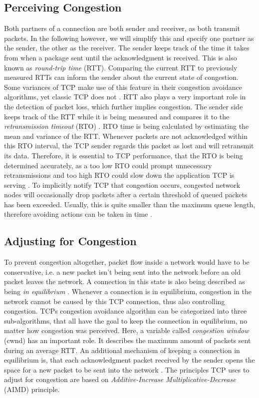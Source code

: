 \documentclass[a4paper,conference]{IEEEtran}
\begin{document}
\subsection{Perceiving Congestion}
\label{P_C_marker}
Both partners of a connection are both sender and receiver, as both transmit packets. In the following however, we will simplify this and specify one partner as the sender, the other as the receiver. The sender keeps track of the time it takes from when a package sent until the acknowledgment is received. This is also known as \textit{round-trip time} (RTT). Comparing the current RTT to previously measured RTTs can inform the sender about the current state of congestion. Some variances of TCP make use of this feature in their congestion avoidance algorithms, yet classic TCP does not \cite{huston2000tcp,jacobson1995congestion}. RTT also plays a very important role in the detection of packet loss, which further implies congestion. The sender side keeps track of the RTT while it is being measured and compares it to the \textit{retransmission timeout} (RTO) \cite{jacobson1992tcp}. RTO time is being calculated by estimating the mean and variance of the RTT. Whenever packets are not acknowledged within this RTO interval, the TCP sender regards this packet as lost and will retransmit its data. Therefore, it is essential to TCP performance, that the RTO is being determined accurately, as a too low RTO could prompt unnecessary retransmissions and too high RTO could slow down the application TCP is serving \cite{huston2000tcp,jacobson1995congestion}. To implicitly notify TCP that congestion occurs, congested network nodes will occasionally drop packets after a certain threshold of queued packets has been exceeded. Usually, this is quite smaller than the maximum queue length, therefore avoiding actions can be taken in time \cite{ramakrishnan1999proposal}.

\subsection{Adjusting for Congestion}
\label{AfC}
To prevent congestion altogether, packet flow inside a network would have to be conservative, i.e. a new packet isn't being sent into the network before an old packet leaves the network. A connection in this state is also being described as being \textit{in equilibrium} \cite{jacobson1992tcp}. Whenever a connection is in equilibrium, congestion in the network cannot be caused by this TCP connection, thus also controlling congestion. TCPs congestion avoidance algorithm can be categorized into three sub-algorithms, that all have the goal to keep the connection in equilibrium, no matter how congestion was perceived. Here, a variable called \textit{congestion window} (cwnd) has an important role. It describes the maximum amount of packets sent during an average RTT. An additional mechanism of keeping a connection in equilibrium is, that each acknowledgment packet received by the sender opens the space for a new packet to be sent into the network \cite{jacobson1992tcp}. The principles TCP uses to adjust for congestion are based on \textit{Additive-Increase Multiplicative-Decrease} (AIMD) principle.
\end{document}
